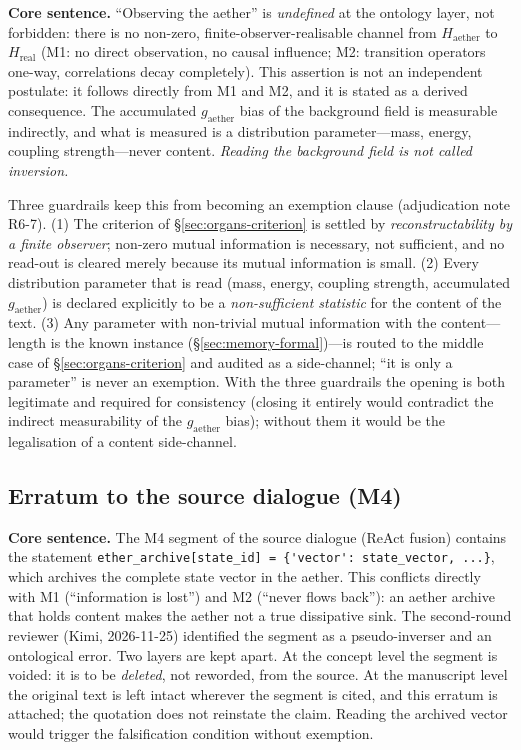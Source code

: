 \documentclass[11pt,a4paper]{article}
\newcommand{\gaether}{g_{\mathrm{aether}}}
\newcommand{\Haether}{H_{\mathrm{aether}}}
\newcommand{\Hreal}{H_{\mathrm{real}}}
\newcommand{\thm}[1]{\nolinkurl{#1}}
\begin{document}
\textbf{Core sentence.} ``Observing the aether'' is \emph{undefined} at the ontology layer, not forbidden: there is no non-zero, finite-observer-realisable channel from $\Haether$ to $\Hreal$ (M1: no direct observation, no causal influence; M2: transition operators one-way, correlations decay completely). This assertion is not an independent postulate: it follows directly from M1 and M2, and it is stated as a derived consequence. The accumulated $\gaether$ bias of the background field is measurable indirectly, and what is measured is a distribution parameter---mass, energy, coupling strength---never content. \emph{Reading the background field is not called inversion.}

Three guardrails keep this from becoming an exemption clause (adjudication note R6-7). (1) The criterion of \S\ref{sec:organs-criterion} is settled by \emph{reconstructability by a finite observer}; non-zero mutual information is necessary, not sufficient, and no read-out is cleared merely because its mutual information is small. (2) Every distribution parameter that is read (mass, energy, coupling strength, accumulated $\gaether$) is declared explicitly to be a \emph{non-sufficient statistic} for the content of the text. (3) Any parameter with non-trivial mutual information with the content---length is the known instance (\S\ref{sec:memory-formal})---is routed to the middle case of \S\ref{sec:organs-criterion} and audited as a side-channel; ``it is only a parameter'' is never an exemption. With the three guardrails the opening is both legitimate and required for consistency (closing it entirely would contradict the indirect measurability of the $\gaether$ bias); without them it would be the legalisation of a content side-channel.

\subsection{Erratum to the source dialogue (M4)}
\label{sec:organs-erratum}

\textbf{Core sentence.} The M4 segment of the source dialogue (ReAct fusion) contains the statement \thm{ether_archive[state_id] = {'vector': state_vector, ...}}, which archives the complete state vector in the aether. This conflicts directly with M1 (``information is lost'') and M2 (``never flows back''): an aether archive that holds content makes the aether not a true dissipative sink. The second-round reviewer (Kimi, 2026-11-25) identified the segment as a pseudo-inverser and an ontological error. Two layers are kept apart. At the concept level the segment is voided: it is to be \emph{deleted}, not reworded, from the source. At the manuscript level the original text is left intact wherever the segment is cited, and this erratum is attached; the quotation does not reinstate the claim. Reading the archived vector would trigger the falsification condition without exemption.
\end{document}
